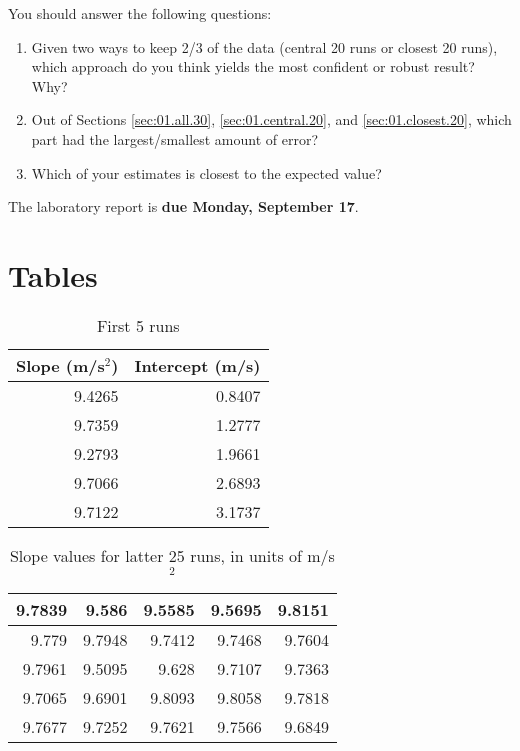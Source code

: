 You should answer the following questions:
\begin{enumerate}
    \item Given two ways to keep 2/3 of the data (central 20 runs or closest 20 runs), which approach do you think yields the most confident or robust result? Why?
    \item Out of Sections \ref{sec:01.all.30}, \ref{sec:01.central.20}, and \ref{sec:01.closest.20}, which part had the largest/smallest amount of error?
    \item Which of your estimates is closest to the expected value?
\end{enumerate}
The laboratory report is \textbf{due Monday, September 17}.
\FloatBarrier
\newpage
\section{Tables}
\begin{table}[ht]
    \centering
    \begin{tabular}{|r|r|}
        \hline
        \textbf{Slope} (m/s$^{2}$) & \textbf{Intercept} (m/s) \\
        \hline
        9.4265 & 0.8407 \\
        9.7359 & 1.2777 \\
        9.2793 & 1.9661 \\
        9.7066 & 2.6893 \\
        9.7122 & 3.1737 \\
        \hline
    \end{tabular}
    \caption{First 5 runs}
    \label{table:01.first.5}
\end{table}
\begin{table}[ht]
    \centering
    \begin{tabular}{|r|r|r|r|r|}
        \hline
        9.7839 & 9.586 & 9.5585 & 9.5695 & 9.8151 \\
        \hline
        9.779 & 9.7948 & 9.7412 & 9.7468 & 9.7604 \\
        \hline
        9.7961 & 9.5095 & 9.628 & 9.7107 & 9.7363 \\
        \hline
        9.7065 & 9.6901 & 9.8093 & 9.8058 & 9.7818 \\
        \hline
        9.7677 & 9.7252 & 9.7621 & 9.7566 & 9.6849 \\
        \hline
    \end{tabular}
    \caption{Slope values for latter 25 runs, in units of m/s$^{2}$}
    \label{table:01.latter.25}
\end{table}

